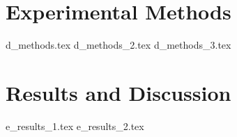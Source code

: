 \documentclass[pdftex,10pt,b5paper,twoside]{book}
\begin{document}


%



\chapter{Experimental Methods}
{d_methods.tex}
{d_methods_2.tex}
{d_methods_3.tex}

\chapter{Results and Discussion}
{e_results_1.tex}
{e_results_2.tex}
%
\end{document}
